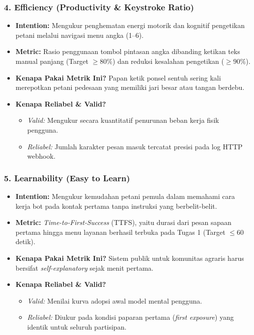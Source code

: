 \documentclass[11pt,a4paper]{article}
\begin{document}
\subsubsection{4. Efficiency (Productivity \& Keystroke Ratio)}
\begin{itemize}[noitemsep]
    \item \textbf{Intention:} Mengukur penghematan energi motorik dan kognitif pengetikan petani melalui navigasi menu angka (1--6).
    \item \textbf{Metric:} Rasio penggunaan tombol pintasan angka dibanding ketikan teks manual panjang (Target $\ge 80\%$) dan reduksi kesalahan pengetikan ($\ge 90\%$).
    \item \textbf{Kenapa Pakai Metrik Ini?} Papan ketik ponsel sentuh sering kali merepotkan petani pedesaan yang memiliki jari besar atau tangan berdebu.
    \item \textbf{Kenapa Reliabel \& Valid?}
    \begin{itemize}[noitemsep]
        \item \textit{Valid:} Mengukur secara kuantitatif penurunan beban kerja fisik pengguna.
        \item \textit{Reliabel:} Jumlah karakter pesan masuk tercatat presisi pada log HTTP webhook.
    \end{itemize}
\end{itemize}

\subsubsection{5. Learnability (Easy to Learn)}
\begin{itemize}[noitemsep]
    \item \textbf{Intention:} Mengukur kemudahan petani pemula dalam memahami cara kerja bot pada kontak pertama tanpa instruksi yang berbelit-belit.
    \item \textbf{Metric:} \textit{Time-to-First-Success} (TTFS), yaitu durasi dari pesan sapaan pertama hingga menu layanan berhasil terbuka pada Tugas 1 (Target $\le 60$ detik).
    \item \textbf{Kenapa Pakai Metrik Ini?} Sistem publik untuk komunitas agraris harus bersifat \textit{self-explanatory} sejak menit pertama.
    \item \textbf{Kenapa Reliabel \& Valid?}
    \begin{itemize}[noitemsep]
        \item \textit{Valid:} Menilai kurva adopsi awal model mental pengguna.
        \item \textit{Reliabel:} Diukur pada kondisi paparan pertama (\textit{first exposure}) yang identik untuk seluruh partisipan.
    \end{itemize}
\end{itemize}
\end{document}
